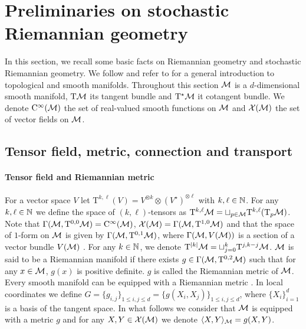 \section{Preliminaries on stochastic Riemannian geometry}
\label{sec:prel-stoch-riem}

In this section, we recall some basic facts on Riemannian geometry and
stochastic Riemannian geometry.  We follow
\cite{hsu2002stochastic,lee2018introduction,lee2006riemannian} and refer to
\cite{lee2010introduction,lee2013smooth} for a general introduction to
topological and smooth manifolds. Throughout this section $\mathcal M$ is a
$d$-dimensional smooth manifold, $\mathrm{T}\mathcal{M}$ its tangent bundle and $\mathrm{T}^\star\mathcal{M}$ it
cotangent bundle. We denote $\mathrm{C}^\infty(\mathcal M)$ the set of real-valued smooth
functions on $\mathcal M$ and $\mathcal{X}(\mathcal{M})$ the set of vector fields on $\mathcal M$.

\subsection{Tensor field, metric, connection and transport}
\label{sec:metr-conn-tens}

\paragraph{Tensor field and Riemannian metric}

For a vector space $V$ let
$\mathrm{T}^{k, \ell}(V) = V^{\otimes k} \otimes (V^\star)^{\otimes \ell}$ with
$k, \ell \in \mathbb{N}$. For any $k, \ell \in \mathbb{N}$ we define the space of
$(k,\ell)$-tensors as
$\mathrm{T}^{k,\ell} \mathcal M = \sqcup_{p \in \mathcal M}
\mathrm{T}^{k,\ell}(\mathrm{T}_p\mathcal M)$. Note that
$\Gamma(\mathcal M, \mathrm{T}^{0,0}\mathcal M) = \mathrm{C}^\infty(\mathcal M)$,
$\mathcal{X}(\mathcal{M}) = \Gamma(\mathcal M, \mathrm{T}^{1,0} \mathcal M)$ and that the space of $1$-form on $\mathcal M$
is given by $\Gamma(\mathcal M, \mathrm{T}^{0,1} \mathcal M)$, where $\Gamma(\mathcal M, V(\mathcal M))$ is a
section of a vector bundle $V(\mathcal M)$ \citep[see][Chapter 10]{lee2013smooth}.  For
any $k \in \mathbb{N}$, we denote
$\mathrm{T}^{\left\vert k \right\vert} \mathcal M = \sqcup_{j=0}^k \mathrm{T}^{j,k-j} \mathcal M$.
$\mathcal M$ is said to be
a Riemannian manifold if there exists $g \in \Gamma(\mathcal M, \mathrm{T}^{0,2} \mathcal M)$ such that for
any $x \in \mathcal M$, $g(x)$ is positive definite. $g$ is called the Riemannian metric
of $\mathcal M$. Every smooth manifold can be equipped with a Riemannian metric
\cite[see][Proposition 2.4]{lee2018introduction}. In local coordinates we define
$G = \{g_{i,j}\}_{1 \leq i,j \leq d} = \{g(X_i, X_j)\}_{1 \leq i,j \leq d}$,
where $\{X_i\}_{i=1}^d$ is a basis of the tangent space. In what follows we
consider that $\mathcal M$ is equipped with a metric $g$ and for any $X, Y \in \mathcal{X}(\mathcal{M})$ we
denote $\langle X,Y \rangle_{\mathcal M} = g(X,Y)$.

